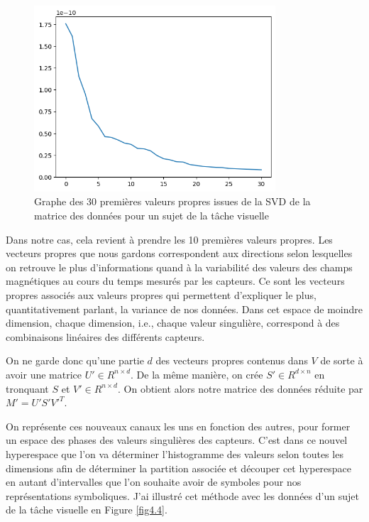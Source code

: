 \begin{figure}[!ht]
    \centering
    \includegraphics[width=9cm]{30vp.png}
    \caption{Graphe des 30 premières valeurs propres issues de la SVD de la matrice des données pour un sujet de la tâche visuelle}
    \label{fig4.3}
\end{figure}

Dans notre cas, cela revient à prendre les 10 premières valeurs propres. Les vecteurs propres que nous gardons correspondent aux directions selon lesquelles on retrouve le plus d'informations quand à la variabilité des valeurs des champs magnétiques au cours du temps mesurés par les capteurs. Ce sont les vecteurs propres associés aux valeurs propres qui permettent d'expliquer le plus, quantitativement parlant, la variance de nos données. Dans cet espace de moindre dimension, chaque dimension, i.e., chaque valeur singulière, correspond à des combinaisons linéaires des différents capteurs. 

\vspace{2ex}
On ne garde donc qu'une partie $d$ des vecteurs propres contenus dans $V$ de sorte à avoir une matrice $U' \in {R}^{n \times d}$. De la même manière, on crée $S' \in {R}^{d \times n}$ en tronquant $S$ et $V' \in {R}^{n \times d}$. On obtient alors notre matrice des données réduite par $M' = U'S'V'^T$.


\vspace{2ex}
On représente ces nouveaux canaux les uns en fonction des autres, pour former un espace des phases des valeurs singulières des capteurs. C'est dans ce nouvel hyperespace que l'on va déterminer l'histogramme des valeurs selon toutes les dimensions afin de déterminer la partition associée et découper cet hyperespace en autant d'intervalles que l'on souhaite avoir de symboles pour nos représentations symboliques. J'ai illustré cet méthode avec les données d'un sujet de la tâche visuelle en Figure \ref{fig4.4}. 

